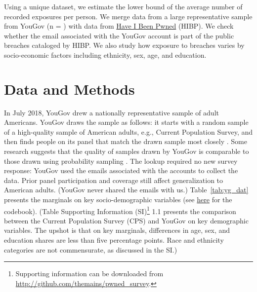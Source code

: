 \documentclass[sigconf]{acmart}
\begin{document}
Using a unique dataset, we estimate the lower bound of the average number of recorded exposures per person. We merge data from a large representative sample from YouGov (n = \sampleSize{}) with data from \href{https://haveibeenpwned.com}{Have I Been Pwned} (HIBP). We check whether the email associated with the YouGov account is part of the \catalogCount{} public breaches cataloged by HIBP. We also study how exposure to breaches varies by socio-economic factors including ethnicity, sex, age, and education.

\section{Data and Methods}
In July 2018, YouGov drew a nationally representative sample of \sampleSize{} adult Americans. YouGov draws the sample as follows: it starts with a random sample of a high-quality sample of American adults, e.g., Current Population Survey, and then finds people on its panel that match the drawn sample most closely \cite{rivers}. Some research suggests that the quality of samples drawn by YouGov is comparable to those drawn using probability sampling \cite{ansolabehere}. The lookup required no new survey response: YouGov used the emails associated with the accounts to collect the data. Prior panel participation and coverage still affect generalization to American adults. (YouGov never shared the emails with us.) Table~\ref{tab:yg_dat} presents the marginals on key socio-demographic variables (see \href{https://github.com/themains/pwned_survey/tree/master/data}{here} for the codebook). (Table Supporting Information (SI)\footnote{Supporting information can be downloaded from \url{http://github.com/themains/pwned_survey}.} 1.1 presents the comparison between the Current Population Survey (CPS) and YouGov on key demographic variables. The upshot is that on key marginals, differences in age, sex, and education shares are less than five percentage points. Race and ethnicity categories are not commensurate, as discussed in the SI.)


\end{document}
